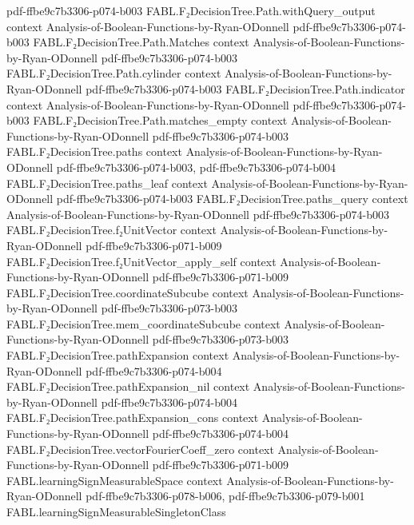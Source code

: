 \begin{theorem}
  {pdf-ffbe9c7b3306-p074-b003}
\proofstep
  {FABL.F₂DecisionTree.Path.withQuery_output}
  {context}
  {Analysis-of-Boolean-Functions-by-Ryan-ODonnell}
  {pdf-ffbe9c7b3306-p074-b003}
\proofstep
  {FABL.F₂DecisionTree.Path.Matches}
  {context}
  {Analysis-of-Boolean-Functions-by-Ryan-ODonnell}
  {pdf-ffbe9c7b3306-p074-b003}
\proofstep
  {FABL.F₂DecisionTree.Path.cylinder}
  {context}
  {Analysis-of-Boolean-Functions-by-Ryan-ODonnell}
  {pdf-ffbe9c7b3306-p074-b003}
\proofstep
  {FABL.F₂DecisionTree.Path.indicator}
  {context}
  {Analysis-of-Boolean-Functions-by-Ryan-ODonnell}
  {pdf-ffbe9c7b3306-p074-b003}
\proofstep
  {FABL.F₂DecisionTree.Path.matches_empty}
  {context}
  {Analysis-of-Boolean-Functions-by-Ryan-ODonnell}
  {pdf-ffbe9c7b3306-p074-b003}
\proofstep
  {FABL.F₂DecisionTree.paths}
  {context}
  {Analysis-of-Boolean-Functions-by-Ryan-ODonnell}
  {pdf-ffbe9c7b3306-p074-b003,
    pdf-ffbe9c7b3306-p074-b004}
\proofstep
  {FABL.F₂DecisionTree.paths_leaf}
  {context}
  {Analysis-of-Boolean-Functions-by-Ryan-ODonnell}
  {pdf-ffbe9c7b3306-p074-b003}
\proofstep
  {FABL.F₂DecisionTree.paths_query}
  {context}
  {Analysis-of-Boolean-Functions-by-Ryan-ODonnell}
  {pdf-ffbe9c7b3306-p074-b003}
\proofstep
  {FABL.F₂DecisionTree.f₂UnitVector}
  {context}
  {Analysis-of-Boolean-Functions-by-Ryan-ODonnell}
  {pdf-ffbe9c7b3306-p071-b009}
\proofstep
  {FABL.F₂DecisionTree.f₂UnitVector_apply_self}
  {context}
  {Analysis-of-Boolean-Functions-by-Ryan-ODonnell}
  {pdf-ffbe9c7b3306-p071-b009}
\proofstep
  {FABL.F₂DecisionTree.coordinateSubcube}
  {context}
  {Analysis-of-Boolean-Functions-by-Ryan-ODonnell}
  {pdf-ffbe9c7b3306-p073-b003}
\proofstep
  {FABL.F₂DecisionTree.mem_coordinateSubcube}
  {context}
  {Analysis-of-Boolean-Functions-by-Ryan-ODonnell}
  {pdf-ffbe9c7b3306-p073-b003}
\proofstep
  {FABL.F₂DecisionTree.pathExpansion}
  {context}
  {Analysis-of-Boolean-Functions-by-Ryan-ODonnell}
  {pdf-ffbe9c7b3306-p074-b004}
\proofstep
  {FABL.F₂DecisionTree.pathExpansion_nil}
  {context}
  {Analysis-of-Boolean-Functions-by-Ryan-ODonnell}
  {pdf-ffbe9c7b3306-p074-b004}
\proofstep
  {FABL.F₂DecisionTree.pathExpansion_cons}
  {context}
  {Analysis-of-Boolean-Functions-by-Ryan-ODonnell}
  {pdf-ffbe9c7b3306-p074-b004}
\proofstep
  {FABL.F₂DecisionTree.vectorFourierCoeff_zero}
  {context}
  {Analysis-of-Boolean-Functions-by-Ryan-ODonnell}
  {pdf-ffbe9c7b3306-p071-b009}
\proofstep
  {FABL.learningSignMeasurableSpace}
  {context}
  {Analysis-of-Boolean-Functions-by-Ryan-ODonnell}
  {pdf-ffbe9c7b3306-p078-b006,
    pdf-ffbe9c7b3306-p079-b001}
\proofstep
  {FABL.learningSignMeasurableSingletonClass}

\end{theorem}
